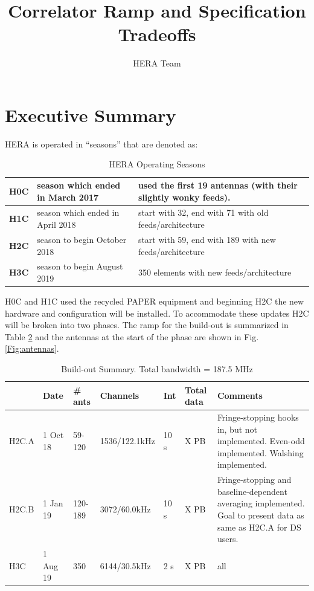 \documentclass{article}
\begin{document}
\author{HERA Team}
\title{Correlator Ramp and Specification Tradeoffs}
\maketitle

\setcounter{section}{-1}
\section*{Executive Summary}
HERA is operated in ``seasons'' that are denoted as:

\vspace{-0.25in}
\begin{table}[H]
\caption{HERA Operating Seasons \label{Tab:seasons}}
\begin{tabular}{p{0.5in} p{2.2in} p{3.5in}} \hline
{\bf H0C} & season which ended in March 2017 & used the first 19 antennas (with their slightly wonky feeds). \\ \hline
{\bf H1C} & season which ended in April 2018    & start with 32, end with 71 with old feeds/architecture\\ \hline
{\bf H2C} & season to begin October 2018         & start with 59, end with 189 with new feeds/architecture\\ \hline
{\bf H3C} & season to begin August 2019           & 350 elements with new feeds/architecture \\ \hline
\end{tabular}
\end{table}

H0C and H1C used the recycled PAPER equipment and beginning H2C the new hardware and configuration will be installed.  To accommodate these updates H2C will be broken into two phases.  
The ramp for the build-out is summarized in Table \ref{Tab:buildout} and the antennas at the start of the phase are shown in Fig. \ref{Fig:antennas}.

\vspace{-0.5cm}
\begin{table}[H]
\caption{Build-out Summary.  Total bandwidth = 187.5 MHz\label{Tab:buildout}}
\begin{tabular}{l l l l l l p{2.2in}}
 & \textbf{Date} & \textbf{\# ants} & \textbf{Channels} & \textbf{Int} & \textbf{Total data} & \textbf{Comments} \\ \hline
H2C.A & 1 Oct 18 &  59-120   & 1536/122.1kHz & 10 s&  X PB& Fringe-stopping hooks in, but not implemented.  Even-odd implemented. Walshing implemented.\\ \hline
H2C.B & 1 Jan 19 & 120-189 & 3072/60.0kHz & 10 s& X PB & Fringe-stopping and baseline-dependent averaging implemented.  Goal to present data as same as H2C.A for DS users.\\ \hline
H3C    & 1 Aug 19 &  350       & 6144/30.5kHz & 2  s&  X PB & all\\ \hline
\end{tabular}
\end{table}
\vspace{1cm}
\end{document}
